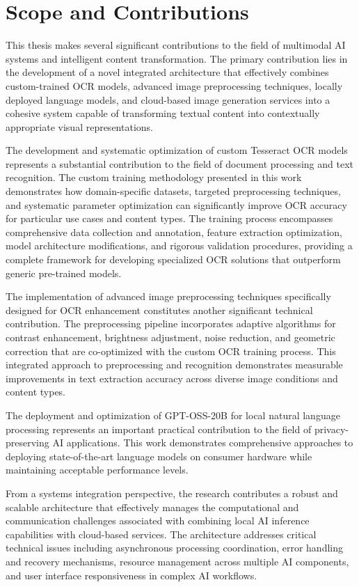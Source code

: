 \section{Scope and Contributions}

This thesis makes several significant contributions to the field of multimodal AI systems and intelligent content transformation. The primary contribution lies in the development of a novel integrated architecture that effectively combines custom-trained OCR models, advanced image preprocessing techniques, locally deployed language models, and cloud-based image generation services into a cohesive system capable of transforming textual content into contextually appropriate visual representations.

The development and systematic optimization of custom Tesseract OCR models represents a substantial contribution to the field of document processing and text recognition. The custom training methodology presented in this work demonstrates how domain-specific datasets, targeted preprocessing techniques, and systematic parameter optimization can significantly improve OCR accuracy for particular use cases and content types. The training process encompasses comprehensive data collection and annotation, feature extraction optimization, model architecture modifications, and rigorous validation procedures, providing a complete framework for developing specialized OCR solutions that outperform generic pre-trained models.

The implementation of advanced image preprocessing techniques specifically designed for OCR enhancement constitutes another significant technical contribution. The preprocessing pipeline incorporates adaptive algorithms for contrast enhancement, brightness adjustment, noise reduction, and geometric correction that are co-optimized with the custom OCR training process. This integrated approach to preprocessing and recognition demonstrates measurable improvements in text extraction accuracy across diverse image conditions and content types.

The deployment and optimization of GPT-OSS-20B for local natural language processing represents an important practical contribution to the field of privacy-preserving AI applications. This work demonstrates comprehensive approaches to deploying state-of-the-art language models on consumer hardware while maintaining acceptable performance levels. 

From a systems integration perspective, the research contributes a robust and scalable architecture that effectively manages the computational and communication challenges associated with combining local AI inference capabilities with cloud-based services. The architecture addresses critical technical issues including asynchronous processing coordination, error handling and recovery mechanisms, resource management across multiple AI components, and user interface responsiveness in complex AI workflows.

